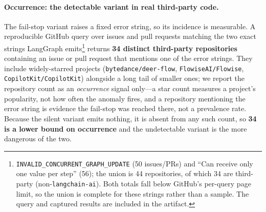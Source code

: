 \documentclass[journal,compsoc,10pt]{IEEEtran}
\theoremstyle{definition}
\theoremstyle{remark}
\begin{document}
\paragraph{Occurrence: the detectable variant in real third-party code.}
The fail-stop variant raises a fixed error string, so its incidence is
measurable. A reproducible GitHub query over issues and pull requests
matching the two exact strings LangGraph
emits\footnote{\texttt{INVALID\_CONCURRENT\_GRAPH\_UPDATE} (50 issues/PRs)
and ``Can receive only one value per step'' (56); the union is 44
repositories, of which 34 are third-party (non-\texttt{langchain-ai}).
Both totals fall below GitHub's per-query page limit, so the union is
complete for these strings rather than a sample. The query and captured
results are included in the artifact.} returns \textbf{34
distinct third-party repositories} containing an issue or pull request that
mentions one of the error strings. They include widely-starred projects
(\texttt{bytedance/deer-flow}, \texttt{FlowiseAI/Flowise},
\texttt{CopilotKit/CopilotKit}) alongside a long tail of smaller ones; we
report the repository count as an \emph{occurrence} signal only---a star
count measures a project's popularity, not how often the anomaly fires, and
a repository mentioning the error string is evidence the fail-stop was
reached there, not a prevalence rate. Because the silent variant emits
nothing, it is absent from any such count, so \textbf{34 is a lower bound on
occurrence} and the undetectable variant is the more dangerous of the two.
\end{document}
